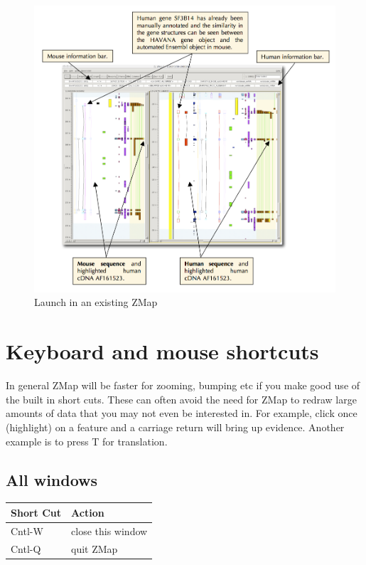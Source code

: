 \documentclass[letterpaper]{article}
\begin{document}
\begin{figure}
\centering
\color[rgb]{0.30980393,0.5058824,0.7411765}
\includegraphics[width=15.231cm]{img_launch_in_zmap.png}
\caption{Launch in an existing ZMap}
\label{img_launch_in_zmap}
\end{figure}

\section{Keyboard and mouse shortcuts}
In general ZMap will be faster for zooming, bumping etc if you make good use of the built in short cuts. These can often avoid the need for ZMap to redraw large amounts of data that you may not even be interested in. For example, click once (highlight) on a feature and a carriage return will bring up evidence. Another example is to press T for translation.

\subsection{All windows}

\begin{supertabular}{|m{6cm}|m{8.5cm}|}
\hline
Short Cut & Action \\
\hline
Cntl-W & close this window \\
Cntl-Q & quit ZMap \\
\hline
\end{supertabular}
\end{document}
